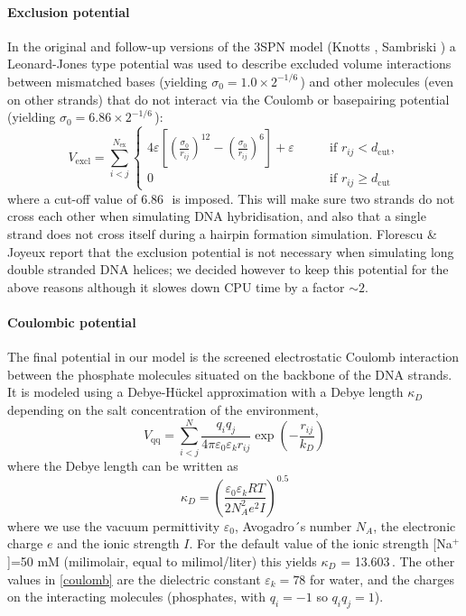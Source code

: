 \paragraph{Exclusion potential} In the original and follow-up versions of the 3SPN model (Knotts \etal \cite{knotts2007coarse}, Sambriski \etal \cite{sambriski2009mesoscale}) a Leonard-Jones type potential was used to describe excluded volume interactions between mismatched bases (yielding $\sigma_0 = 1.0 \times 2^{-1/6}$\,\Angstrom) and other molecules (even on other strands) that do not interact via the Coulomb or basepairing potential (yielding $\sigma_0 = 6.86 \times 2^{-1/6}$\,\Angstrom):
\begin{equation}
V_\text{excl} =  \sum_{i<j}^{N_\text{ex}}\begin{cases} 4\varepsilon \left[ \left(\frac{\sigma_{0}}{r_{ij}} \right)^{12} - \left(\frac{\sigma_{0}}{r_{ij}} \right)^{6} \right] + \varepsilon \qquad &\text{if }r_{ij} < d_\text{cut}, \\ 0 \qquad &\text{if }r_{ij} \geq d_\text{cut} \end{cases} \end{equation}
where a cut-off value of 6.86\,\Angstrom\ is imposed. This will make sure two strands do not cross each other when simulating DNA hybridisation, and also that a single strand does not cross itself during a hairpin formation simulation. Florescu \& Joyeux \cite{florescu2011thermal} report that the exclusion potential is not necessary when simulating long double stranded DNA helices; we decided however to keep this potential for the above reasons although it slowes down CPU time by a factor $\sim 2$.

\paragraph{Coulombic potential} The final potential in our model is the screened electrostatic Coulomb interaction between the phosphate molecules situated on the backbone of the DNA strands. It is modeled using a Debye-H\"uckel approximation with a Debye length $\kappa_D$ depending on the salt concentration of the environment,
\begin{equation}
V_\text{qq} =\sum_{i<j}^N  \frac{q_i q_j}{4\pi \varepsilon_0 \varepsilon_k r_{ij}} \exp \left(- \frac{r_{ij}}{k_D}  \right)
\label{coulomb}\end{equation}
where the Debye length can be written as
\begin{equation}
\kappa_D = \left( \frac{\varepsilon_0 \varepsilon_k RT}{2N^2_A e^2 I} \right)^{0.5}
\end{equation}
where we use the vacuum permittivity $\varepsilon_0$, Avogadro´s number $N_A$, the electronic charge $e$ and the ionic strength $I$. For the default value of the ionic strength [Na$^+$]=50 mM (milimolair, equal to milimol/liter) this yields $\kappa_D$ = 13.603\,\Angstrom. The other values in \ref{coulomb} are the dielectric constant $\varepsilon_k = 78$ for water, and the charges on the interacting molecules (phosphates, with $q_i = -1$ so $q_i q_j = 1$).

